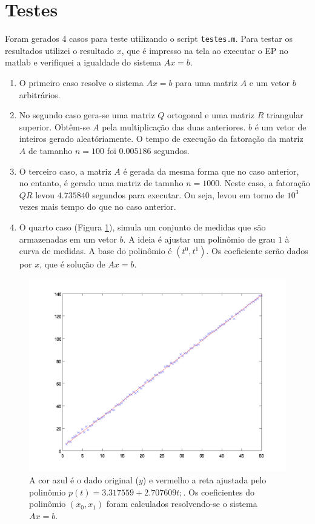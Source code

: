 \documentclass[a4paper,11pt]{article}
\begin{document}
\section*{Testes}
Foram gerados 4 casos para teste utilizando o script \texttt{testes.m}. Para testar os resultados utilizei o resultado $x$, que é impresso na tela ao executar o EP no matlab e verifiquei a igualdade do sistema $Ax=b$.
\begin{enumerate}
\item O primeiro caso resolve o sistema $Ax=b$ para uma matriz $A$ e um vetor $b$ arbitrários. 

\item No segundo caso gera-se uma matriz $Q$ ortogonal e uma matriz $R$ triangular superior. Obtêm-se $A$ pela multiplicação das duas anteriores. $b$ é um vetor de inteiros gerado aleatóriamente. O tempo de execução da fatoração da matriz $A$ de tamanho $n=100$ foi $0.005186$ segundos. 

\item O terceiro caso, a matriz $A$ é gerada da mesma forma que no caso anterior, no entanto, é gerado uma matriz de tamnho $n=1000$. Neste caso, a fatoração $QR$ levou $4.735840$ segundos para executar. Ou seja, levou em torno de $10^3$ vezes mais tempo do que no caso anterior. 

\item O quarto caso (Figura \ref{fig}), simula um conjunto de medidas que são armazenadas em um vetor $b$. A ideia é ajustar um polinômio de grau $1$ à curva de medidas. A base do polinômio é $(t^0 , t^1)$. Os coeficiente serão dados por $x$, que é solução de $Ax=b$.

\end{enumerate}

\begin{center}
\begin{figure}[h]
\includegraphics[width=15cm,keepaspectratio]{curve_fit.png}
\caption{A cor azul é o dado original ($y$) e vermelho a reta ajustada pelo polinômio $p(t) = 3.317559 + 2.707609t;$. Os coeficientes do polinômio $(x_0,x_1)$ foram calculados resolvendo-se o sistema $Ax=b$. }
\label{fig}
\end{figure}
\end{center}
\end{document}
